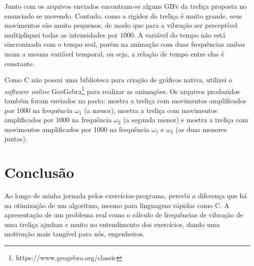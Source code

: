 \documentclass[12pt]{article} %
\begin{document}
            Junto com os arquivos enviados encontram-se alguns GIFs da treliça proposta no enunciado se movendo. Contudo, como a rigidez da treliça é muito grande, seus movimentos são muito pequenos, de modo que para a vibração ser perceptível multipliquei todas as intensidades por $1000$. A variável do tempo não está sincronizada com o tempo real, porém na animação com duas frequências ambas usam a mesma variável temporal, ou seja, a relação de tempo entre elas é constante.
            
            Como C não possui uma biblioteca para criação de gráficos nativa, utilizei o \textit{software online} GeoGebra\footnote{https://www.geogebra.org/classic} para realizar as animações. Os arquivos produzidos também foram enviados na pasta:  mostra a treliça com movimentos amplificados por 1000 na frequência $\omega_1$ (a menor),  mostra a treliça com movimentos amplificados por 1000 na frequência $\omega_2$ (a segunda menor) e  mostra a treliça com movimentos amplificados por 1000 na frequência $\omega_1$ e $\omega_2$ (as duas menores juntas).
            
            \vspace{\baselineskip}
            
    \section{Conclusão}
        
        Ao longo de minha jornada pelos exercícios-programa, percebi a diferença que há na otimização de um algoritmo, mesmo para linguagens rápidas como C. A apresentação de um problema real como o cálculo de frequências de vibração de uma treliça ajudam e muito no entendimento dos exercícios, dando uma motivação mais tangível para nós, engenheiros.
        
\end{document}
